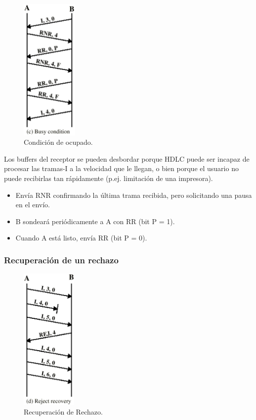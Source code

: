 \documentclass[withindex,glossary]{cam-thesis}
\begin{document}
\begin{figure}[H]
\centering
\includegraphics[height=7.0cm]{images/HDLC_BusyCondition}
\caption[Condición de ocupado]{Condición de ocupado.}
\end{figure}

Los buffers del receptor se pueden desbordar porque HDLC puede ser incapaz de procesar las tramas-I a la velocidad que le llegan, o bien porque el usuario no puede recibirlas tan rápidamente (p.ej. limitación de una impresora).
\begin{itemize}
	\item Envía RNR confirmando la última trama recibida, pero solicitando una pausa en el envío.
	\item B sondeará periódicamente a A con RR (bit P = 1).
	\item Cuando A está listo, envía RR (bit P = 0).
\end{itemize}

\subsubsection{Recuperación de un rechazo}

\begin{figure}[H]
\centering
\includegraphics[height=7.0cm]{images/HDLC_RejectRecovery}
\caption[Recuperación de Rechazo]{Recuperación de Rechazo.}
\end{figure}
\end{document}
